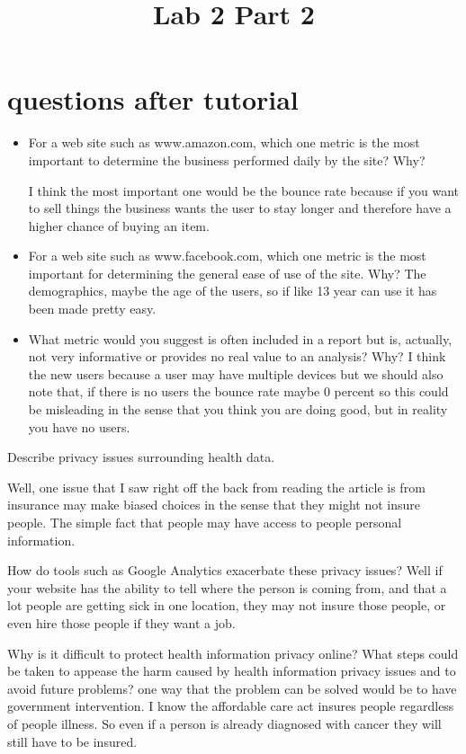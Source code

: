 \documentclass{article}
\begin{document}
\newpage
\section{questions after tutorial}
\begin{itemize}
    \item For a web site such as www.amazon.com, which one metric is the most important to determine the business performed daily by the site? Why? 
    
    I think the most important one would be the bounce rate because if you want to sell things the business wants the user to stay longer and therefore have a higher chance of buying an item. 
    
\item For a web site such as www.facebook.com, which one metric is the most important for determining the general ease of use of the site. Why?
The demographics, maybe the age of the users, so if like 13 year can use it has been made pretty easy. 

\item What metric would you suggest is often included in a report but is, actually, not very informative or provides no real value to an analysis? Why?
I think the new users because a user may have multiple devices but we should also note that, if there is no users the bounce rate maybe 0 percent so this could be misleading in the sense that you think you are doing good, but in reality you have no users.  

\end{itemize}

\newpage
\title{Lab 2 Part 2 }

\maketitle
Describe privacy issues surrounding health data.

Well, one issue that I saw right off the back from reading the article is from insurance may make biased choices in the sense that they might not insure people. The simple fact that people may have access to people personal information. 

 How do tools such as Google Analytics exacerbate these privacy issues?
Well if your website has the ability to tell where the person is coming from, and that a lot people are getting sick in one location, they may not insure those people, or even hire those people if they want a job.  
 
 Why is it difficult to protect health information privacy online?
 What steps could be taken to appease the harm caused by health information privacy issues and to avoid future problems?
 one way that the problem can be solved would be to have government intervention. I know the affordable care act insures people regardless of people illness. So even if a person is already diagnosed with cancer they will still have to be insured. 
\end{document}
